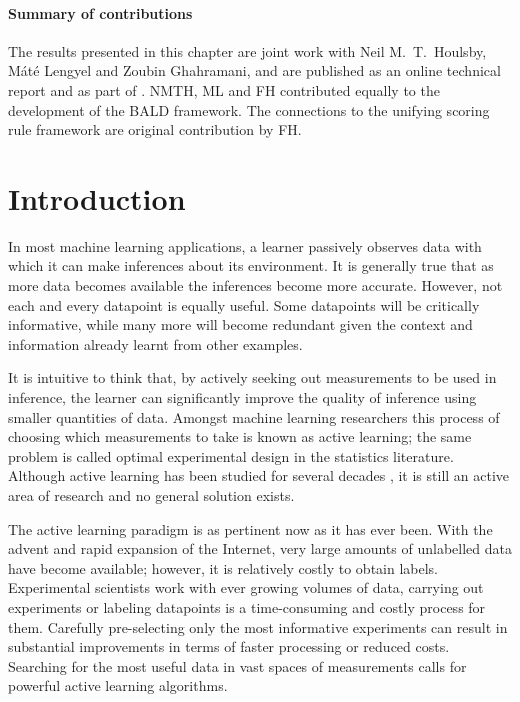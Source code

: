 
\paragraph{Summary of contributions} The results presented in this chapter are joint work with Neil M.\ T.\ Houlsby, M\'{a}t\'{e} Lengyel and Zoubin Ghahramani, and are published as an online technical report \citep{Houlsby2011} and as part of \citep{Houlsby2012preference}. NMTH, ML and FH contributed equally to the development of the BALD framework. The connections to the unifying scoring rule framework are original contribution by FH.

\section{Introduction}

In most machine learning applications, a learner passively observes data with which it can make inferences about its environment. It is generally true that as more data becomes available the inferences become more accurate. However, not each and every datapoint is equally useful. Some datapoints will be critically informative, while many more will become redundant given the context and information already learnt from other examples.

It is intuitive to think that, by actively seeking out measurements to be used in inference, the learner can significantly improve the quality of inference using smaller quantities of data. Amongst machine learning researchers this process of choosing which measurements to take is known as active learning; the same problem is called optimal experimental design in the statistics literature. Although active learning has been studied for several decades \citep{lindley1956,jaynes1986}, it is still an active area of research and no general solution exists.

The active learning paradigm is as pertinent now as it has ever been. With the advent and rapid expansion of the Internet, very large amounts of unlabelled data have become available; however, it is relatively costly to obtain labels. Experimental scientists work with ever growing volumes of data, carrying out experiments or labeling datapoints is a time-consuming and costly process for them. Carefully pre-selecting only the most informative experiments can result in substantial improvements in terms of faster processing or reduced costs. Searching for the most useful data in vast spaces of measurements calls for powerful active learning algorithms.

